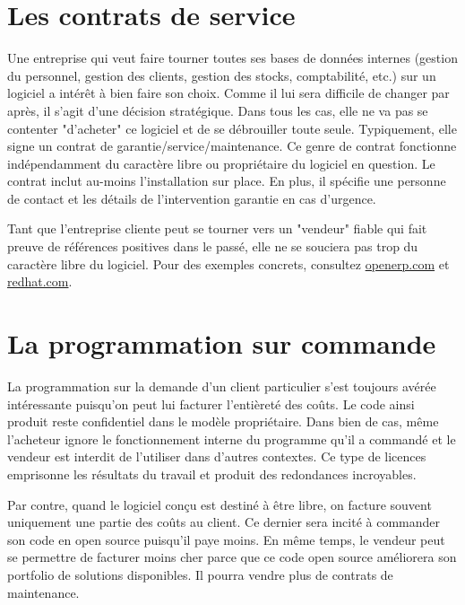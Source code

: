 \section*{Les contrats de service}
Une entreprise qui veut faire tourner toutes ses bases de données internes (gestion du personnel,
gestion des clients, gestion des stocks, comptabilité, etc.) sur un logiciel a intérêt à bien faire son choix.
Comme il lui sera difficile de changer par après, il s'agit d'une décision stratégique.
Dans tous les cas, elle ne va pas se contenter "d'acheter" ce logiciel et de se débrouiller toute seule.
Typiquement, elle signe un contrat de garantie/service/maintenance. Ce genre de contrat fonctionne indépendamment du
caractère libre ou propriétaire du logiciel en question. Le contrat inclut au-moins l'installation sur place.
En plus, il spécifie une personne de contact et les détails de l'intervention garantie en cas d'urgence.

Tant que l'entreprise cliente peut se tourner vers un "vendeur" fiable qui fait preuve de références 
positives dans le passé, elle ne se souciera pas trop du caractère libre du logiciel.
Pour des exemples concrets, consultez \url{openerp.com} et \url{redhat.com}.

\section*{La programmation sur commande}
La programmation sur la demande d'un client particulier s'est toujours avérée intéressante puisqu'on
peut lui facturer l'entièreté des coûts. Le code ainsi produit reste confidentiel dans le
modèle propriétaire. Dans bien de cas, même l'acheteur ignore le fonctionnement 
interne du programme qu'il a commandé et le vendeur est interdit de l'utiliser dans d'autres contextes.
Ce type de licences emprisonne les résultats du travail et produit des redondances incroyables.

Par contre, quand le logiciel conçu est destiné à être libre, on facture souvent uniquement une partie 
des coûts au client. Ce dernier sera incité à commander son code en open source puisqu'il paye moins.
En même temps, le vendeur peut se permettre de facturer moins cher parce que ce code open source
améliorera son portfolio de solutions disponibles. Il pourra vendre plus de contrats de maintenance.

